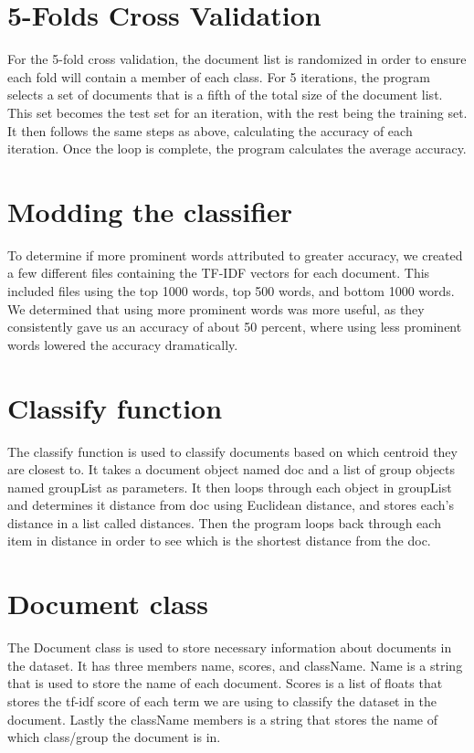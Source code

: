 \documentclass[12pt]{article}
\begin{document}
\section{5-Folds Cross Validation}
\indent For the 5-fold cross validation, the document list is randomized in order to ensure each fold will contain a member of each class. For 5 iterations, the program selects a set of documents that is a fifth of the total size of the document list. This set becomes the test set for an iteration, with the rest being the training set. It then follows the same steps as above, calculating the accuracy of each iteration. Once the loop is complete, the program calculates the average accuracy.\\
\section{Modding the classifier}
\indent To determine if more prominent words attributed to greater accuracy, we created a few different files containing the TF-IDF vectors for each document. This included files using the top 1000 words, top 500 words, and bottom 1000 words. We determined that using more prominent words was more useful, as they consistently gave us an accuracy of about 50 percent, where using less prominent words lowered the accuracy dramatically.\\

\section{Classify function}
\indent The classify function is used to classify documents based on which centroid they are closest to. It takes a document object named doc and a list of group objects named groupList as parameters. It then loops through each object in groupList and determines it distance from doc using Euclidean distance, and stores each's distance in a list called distances. Then the program loops back through each item in distance in order to see which is the shortest distance from the doc. 

\section{Document class}
\indent The Document class is used to store necessary information about documents in the dataset. It has three members name, scores,  and className. Name is a string that is used to store the name of each document. Scores is a list of floats that stores the tf-idf score of each term we are using to classify the dataset in the document. Lastly the className members is a string that stores the name of which class/group the document is in.
\end{document}
